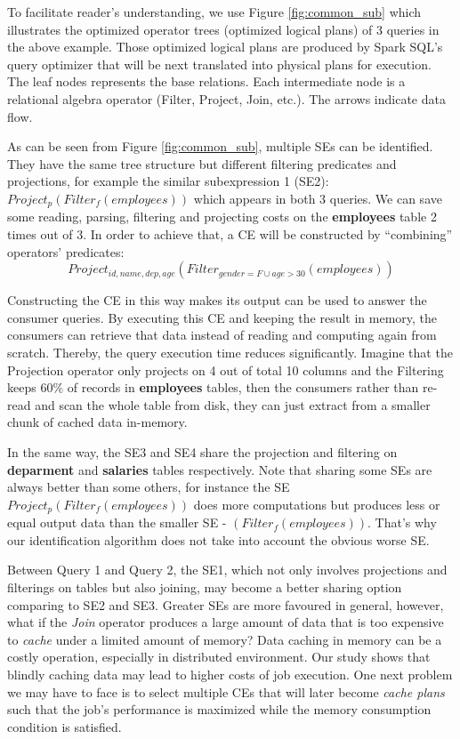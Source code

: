 To facilitate reader's understanding, we use Figure \ref{fig:common_sub} which illustrates the optimized operator trees (optimized logical plans) of 3 queries in the above example. Those optimized logical plans are produced by Spark SQL's query optimizer that will be next translated into physical plans for execution. The leaf nodes represents the base relations. Each intermediate node is a relational algebra operator (Filter, Project, Join, etc.). The arrows indicate data flow.

As can be seen from Figure \ref{fig:common_sub}, multiple SEs can be identified. They have the same tree structure but different filtering predicates and projections, for example the similar subexpression 1 (SE2): $Project_p(Filter_f(employees))$ which appears in both 3 queries. We can save some reading, parsing, filtering and projecting costs on the \textbf{employees} table 2 times out of 3. In order to achieve that, a CE will be constructed by ``combining'' operators' predicates: \[Project_{id, name, dep, age}(Filter_{gender=F \cup age>30}(employees))\]

Constructing the CE in this way makes its output can be used to answer the consumer queries. By executing this CE and keeping the result in memory, the consumers can retrieve that data instead of reading and computing again from scratch. Thereby, the query execution time reduces significantly. Imagine that the Projection operator only projects on 4 out of total 10 columns and the Filtering keeps 60\% of records in \textbf{employees} tables, then the consumers rather than re-read and scan the whole table from disk, they can just extract from a smaller chunk of cached data in-memory. 

In the same way, the SE3 and SE4 share the projection and filtering on \textbf{deparment} and  \textbf{salaries} tables respectively. Note that sharing some SEs are always better than some others, for instance the SE $Project_p(Filter_f(employees))$ does more computations but produces less or equal output data than the smaller SE - $(Filter_f(employees))$. That's why our identification algorithm does not take into account the obvious worse SE.

Between Query 1 and Query 2, the SE1, which not only involves projections and filterings on tables but also joining, may become a better sharing option comparing to SE2 and SE3. Greater SEs are more favoured in general, however, what if the \emph{Join} operator produces a large amount of data that is too expensive to \emph{cache} under a limited amount of memory? Data caching in memory can be a costly operation, especially in distributed environment. Our study shows that blindly caching data may lead to higher costs of job execution. One next problem we may have to face is to select multiple CEs that will later become \emph{cache plans} such that the job's performance is maximized while the memory consumption condition is satisfied.

